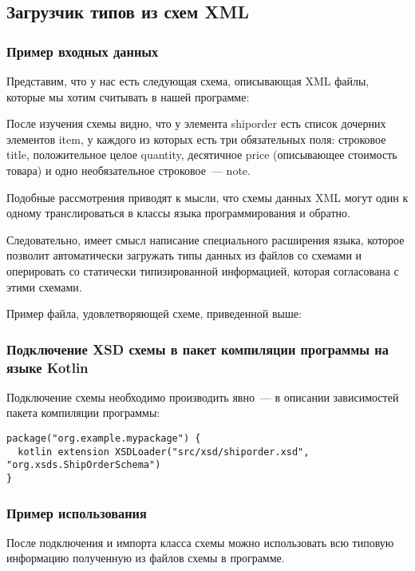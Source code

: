 \documentclass{article}
\begin{document}
\subsection{Загрузчик типов из схем XML}

\subsubsection{Пример входных данных}
Представим, что у нас есть следующая схема, описывающая XML файлы, которые мы хотим считывать в нашей программе:



После изучения схемы видно, что у элемента shiporder есть список дочерних элементов item, у каждого из которых есть три обязательных поля: строковое title, положительное целое quantity, десятичное price (описывающее стоимость товара) и одно необязательное строковое~--- note.

Подобные рассмотрения приводят к мысли, что схемы данных XML могут один к одному транслироваться в классы языка программирования и обратно.

Следовательно, имеет смысл написание специального расширения языка, которое позволит автоматически загружать типы данных из файлов со схемами и оперировать со статически типизированной информацией, которая согласована с этими схемами.

Пример файла, удовлетворяющей схеме, приведенной выше:



\subsubsection{Подключение XSD схемы в пакет компиляции программы на языке Kotlin}
Подключение схемы необходимо производить явно~--- в описании зависимостей пакета компиляции программы:
\begin{lstlisting}
package("org.example.mypackage") {
  kotlin extension XSDLoader("src/xsd/shiporder.xsd", "org.xsds.ShipOrderSchema")
}
\end{lstlisting}

\subsubsection{Пример использования}
После подключения и импорта класса схемы можно использовать всю типовую информацию полученную из файлов схемы в программе.
\end{document}
